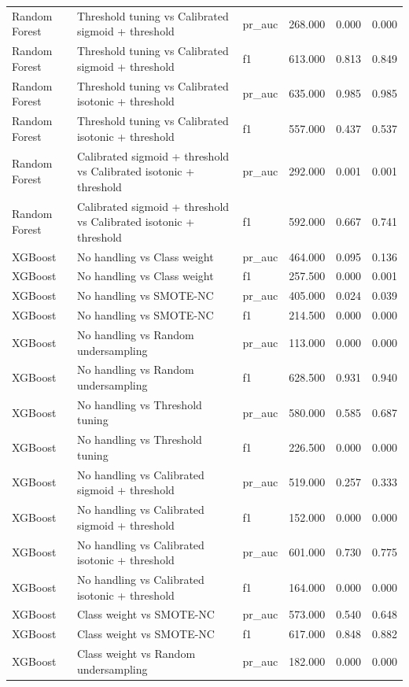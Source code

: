 \begin{tabular}{lllrrr}
Random Forest & Threshold tuning vs Calibrated sigmoid + threshold & pr_auc & 268.000 & 0.000 & 0.000 \\
Random Forest & Threshold tuning vs Calibrated sigmoid + threshold & f1 & 613.000 & 0.813 & 0.849 \\
Random Forest & Threshold tuning vs Calibrated isotonic + threshold & pr_auc & 635.000 & 0.985 & 0.985 \\
Random Forest & Threshold tuning vs Calibrated isotonic + threshold & f1 & 557.000 & 0.437 & 0.537 \\
Random Forest & Calibrated sigmoid + threshold vs Calibrated isotonic + threshold & pr_auc & 292.000 & 0.001 & 0.001 \\
Random Forest & Calibrated sigmoid + threshold vs Calibrated isotonic + threshold & f1 & 592.000 & 0.667 & 0.741 \\
XGBoost & No handling vs Class weight & pr_auc & 464.000 & 0.095 & 0.136 \\
XGBoost & No handling vs Class weight & f1 & 257.500 & 0.000 & 0.001 \\
XGBoost & No handling vs SMOTE-NC & pr_auc & 405.000 & 0.024 & 0.039 \\
XGBoost & No handling vs SMOTE-NC & f1 & 214.500 & 0.000 & 0.000 \\
XGBoost & No handling vs Random undersampling & pr_auc & 113.000 & 0.000 & 0.000 \\
XGBoost & No handling vs Random undersampling & f1 & 628.500 & 0.931 & 0.940 \\
XGBoost & No handling vs Threshold tuning & pr_auc & 580.000 & 0.585 & 0.687 \\
XGBoost & No handling vs Threshold tuning & f1 & 226.500 & 0.000 & 0.000 \\
XGBoost & No handling vs Calibrated sigmoid + threshold & pr_auc & 519.000 & 0.257 & 0.333 \\
XGBoost & No handling vs Calibrated sigmoid + threshold & f1 & 152.000 & 0.000 & 0.000 \\
XGBoost & No handling vs Calibrated isotonic + threshold & pr_auc & 601.000 & 0.730 & 0.775 \\
XGBoost & No handling vs Calibrated isotonic + threshold & f1 & 164.000 & 0.000 & 0.000 \\
XGBoost & Class weight vs SMOTE-NC & pr_auc & 573.000 & 0.540 & 0.648 \\
XGBoost & Class weight vs SMOTE-NC & f1 & 617.000 & 0.848 & 0.882 \\
XGBoost & Class weight vs Random undersampling & pr_auc & 182.000 & 0.000 & 0.000 \\

\end{tabular}

